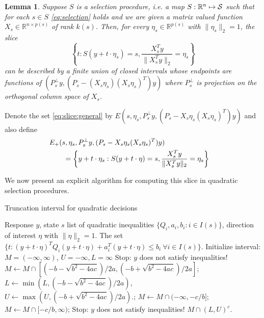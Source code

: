 \documentclass{imsart}
\newcommand{\real}{\mathbb{R}}
\newtheorem{lemma}[theorem]{Lemma}
\begin{document}
\begin{lemma}
Suppose $S$ is a selection procedure, i.e. a map $S:\real^n \mapsto {\cal S}$
such that for each $s \in S$ \eqref{eq:selection} holds 
and we are given a matrix valued function $X_s \in \real^{n \times p(s)}$ of rank
$k(s)$.
Then, for every $\eta_s \in \real^{p(s)}$ with $\|\eta_s\|_2=1$, the
slice
\begin{equation}
\label{eq:slice:general}
\left\{t: S(y+t \cdot \eta_s)=s, \frac{X_s^Ty}{\|X_s^Ty\|_2}=\eta_s \right\}
\end{equation}
can be described by
a finite union of closed intervals whose endpoints are functions of 
$(P_s^{\perp}y, (P_s- (X_s\eta_s)(X_s\eta_s)^T)y)$ where
$P_s^{\perp}$ is projection on the orthogonal column space of $X_s$.
\end{lemma}
Denote the set \eqref{eq:slice:general} by $E(s, \eta_s, P_s^{\perp}y, (P_s - X_s \eta_s(X_s\eta_s)^T)y)$ and also define
$$
\begin{aligned}
\lefteqn{
E_+(s, \eta_s, P_s^{\perp}y, (P_s - X_s \eta_s(X_s\eta_s)^T)y) } \\
 & \qquad = \left\{y + t \cdot \eta_s: S(y+t \cdot \eta)=s, \frac{X_s^Ty}{\|X_s^Ty\|_2}=\eta_s \right\} \\
\end{aligned}
$$

We now present an explicit algorithm for computing this slice in quadratic selection procedures.

\begin{algorithm}
 \caption{Truncation interval for quadratic decisions}
 \label{algo:quadratic}
 \begin{algorithmic}
   \REQUIRE Response $y$, state $s$ list of quadratic inequalities $\{Q_i, a_i, b_i: i \in I(s)\}$, direction
   of interest $\eta$ with $\|\eta\|_2=1$.
   \ENSURE The set $\{t: (y+t \cdot \eta)^TQ_i(y+t \cdot \eta) + a_i^T(y+t \cdot \eta) \leq b_i  \ \forall i \in I(s) \}$.
      \STATE Initialize  interval: $M= (-\infty,\infty)$, $U=-\infty, L=\infty$
    \STATE Stop: $y$ does not satisfy inequalities!
     \STATE $M \gets M \cap [(-b-\sqrt{b^2-4ac})/2a, (-b+\sqrt{b^2-4ac})/2a]$;
     \STATE $L \gets \min(L,(-b-\sqrt{b^2-4ac})/2a)$,
     \STATE $U \gets \max(U,(-b+\sqrt{b^2-4ac})/2a).$;
    \ENDIF
    \ELSE
   \STATE $M \gets M \cap (-\infty, -c/b]$;
   \STATE $M \gets M \cap [-c/b,\infty)$;
   \STATE Stop: $y$ does not satisfy inequalities!
   \ENDIF
   \ENDIF
   \ENDFOR
   \RETURN $M \cap (L,U)^c.$
 \end{algorithmic}
\end{algorithm}
\end{document}
